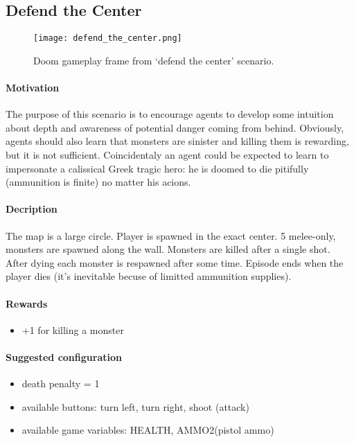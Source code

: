 	\subsection{Defend the Center}\label{subsec:defend_the_center}
		\begin{figure}
			\centering
			\texttt{[image: defend\_the\_center.png]}
			\caption{Doom gameplay frame from `defend the center' scenario.}\label{fig:defend_the_center}
		\end{figure}
		\paragraph{Motivation} 
			The purpose of this scenario is to encourage agents to develop some intuition about depth and awareness of potential danger coming from behind. Obviously, agents should also learn that monsters are sinister and killing them is rewarding, but it is not sufficient. Coincidentaly an agent could be expected to learn to impersonate a calissical Greek tragic hero: he is doomed to die pitifully (ammunition is finite) no matter his acions.

		\paragraph{Decription}
			The map is a large circle. Player is spawned in the exact center. 5 melee-only, monsters are spawned along the wall. Monsters are killed after a single shot. After dying each monster is respawned after some time. Episode ends when the player dies (it's inevitable becuse of limitted ammunition supplies).

		\paragraph{Rewards}
			\begin{itemize}
				\item +1 for killing a monster
			\end{itemize}
		
		\paragraph{Suggested configuration}
			\begin{itemize}
				\item death penalty = 1
				\item available buttons: turn left, turn right, shoot (attack)
				\item available game variables: HEALTH, AMMO2(pistol ammo)
			\end{itemize}
	\newpage

